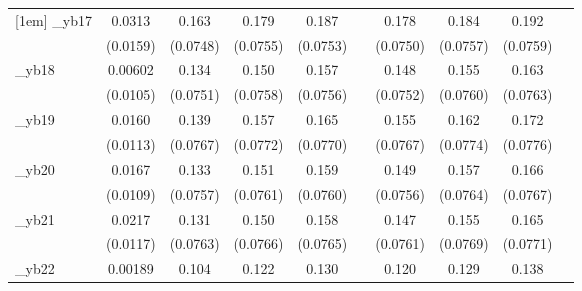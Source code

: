 \begin{table}[htbp]
\begin{tabular}{l*{9}{c}}
[1em]
\_yb17       &      0.0313\sym{**} &       0.163\sym{**} &       0.179\sym{**} &       0.187\sym{**} &                     &       0.178\sym{**} &       0.184\sym{**} &       0.192\sym{**} &                     \\
            &    (0.0159)         &    (0.0748)         &    (0.0755)         &    (0.0753)         &                     &    (0.0750)         &    (0.0757)         &    (0.0759)         &                     \\
[1em]
\_yb18       &     0.00602         &       0.134\sym{*}  &       0.150\sym{**} &       0.157\sym{**} &                     &       0.148\sym{**} &       0.155\sym{**} &       0.163\sym{**} &                     \\
            &    (0.0105)         &    (0.0751)         &    (0.0758)         &    (0.0756)         &                     &    (0.0752)         &    (0.0760)         &    (0.0763)         &                     \\
[1em]
\_yb19       &      0.0160         &       0.139\sym{*}  &       0.157\sym{**} &       0.165\sym{**} &                     &       0.155\sym{**} &       0.162\sym{**} &       0.172\sym{**} &                     \\
            &    (0.0113)         &    (0.0767)         &    (0.0772)         &    (0.0770)         &                     &    (0.0767)         &    (0.0774)         &    (0.0776)         &                     \\
[1em]
\_yb20       &      0.0167         &       0.133\sym{*}  &       0.151\sym{**} &       0.159\sym{**} &                     &       0.149\sym{**} &       0.157\sym{**} &       0.166\sym{**} &                     \\
            &    (0.0109)         &    (0.0757)         &    (0.0761)         &    (0.0760)         &                     &    (0.0756)         &    (0.0764)         &    (0.0767)         &                     \\
[1em]
\_yb21       &      0.0217\sym{*}  &       0.131\sym{*}  &       0.150\sym{*}  &       0.158\sym{**} &                     &       0.147\sym{*}  &       0.155\sym{**} &       0.165\sym{**} &                     \\
            &    (0.0117)         &    (0.0763)         &    (0.0766)         &    (0.0765)         &                     &    (0.0761)         &    (0.0769)         &    (0.0771)         &                     \\
[1em]
\_yb22       &     0.00189         &       0.104         &       0.122         &       0.130\sym{*}  &                     &       0.120         &       0.129\sym{*}  &       0.138\sym{*}  &                     \\

\end{tabular}
\end{table}
